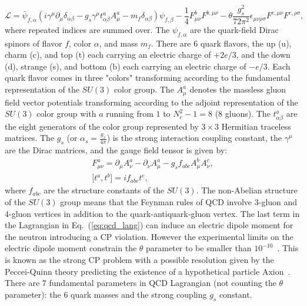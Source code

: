  \begin{equation} \label{eq:qcd_lang}
\mathcal{L} =  \bar{\psi}_{f,\alpha} (i \gamma^{\mu}\partial_{\mu}\delta_{\alpha\beta}-g_{s}\gamma^{\mu}t^{a}_{\alpha\beta}A^{a}_{\mu}-m_{f}\delta_{\alpha\beta})\psi_{f,\beta}-\frac{1}{4}F_{\mu\nu}^{b}F^{b,\mu\nu}-\theta\frac{g_{s}^2}{72\pi^2}\epsilon_{\mu\nu\rho\sigma}F^{c,\mu\nu}F^{c,\rho\sigma},
\end{equation}
where repeated indices are summed over. The $\psi_{f,\alpha}$ are the quark-field Dirac spinors of flavor $f$, color $\alpha$, and mass $m_{f}$. There are $6$ quark flavors, the up (u), charm (c), and top (t) each carrying an electric charge of $+2e/3$, and the down (d), strange (s), and bottom (b) each carrying an electric charge of $-e/3$. Each quark flavor comes in three "colors" transforming according to the fundamental representation of the $SU(3)$ color group. The $A_{\mu}^{a}$ denotes the massless gluon field vector potentials transforming according to the adjoint representation of the $SU(3)$ color group with $a$ running from $1$ to $N_{c}^2-1=8$ (8 gluons).  The $t_{\alpha\beta}^{a}$ are the eight generators of the color group represented by $3 \times 3$ Hermitian traceless matrices. The $g_{s}$ (or $\alpha_{s} = \frac{g_{s}}{4\pi}$) is the strong interaction coupling constant, the $\gamma^{\mu}$ are the Dirac matrices, and the gauge field tensor is given by:
 \begin{eqnarray} \label{eq:qcd_field}
F_{\mu\nu}^{a} = \partial_{\mu}A_{\nu}^a-\partial_{\nu}A_{\mu}^a-g_{s}f_{abc}A_{\mu}^{b}A_{\nu}^{c},  \\
\mathrm{[}t^a,t^b\mathrm{]}=if_{abc}t^{c},
\end{eqnarray}
where $f_{abc}$ are the structure constants of the $SU(3)$. The non-Abelian structure of the $SU(3)$ group means that the Feynman rules of QCD involve 3-gluon and 4-gluon vertices in addition to the quark-antiquark-gluon vertex. The last term in the Lagrangian in Eq.~(\ref{eq:qcd_lang}) can induce an electric dipole moment for the neutron introducing a CP violation. However the experimental limits on the electric dipole moment constrain the $\theta$ parameter to be smaller than $10^{-10}$~\cite{Agashe:2014kda}. This is known as the strong CP problem with a possible resolution given by the Peccei-Quinn theory predicting the existence of a hypothetical particle Axion~\cite{PhysRevLett.38.1440}. There are $7$ fundamental parameters in QCD Lagrangian (not counting the $\theta$ parameter): the $6$ quark masses and the strong coupling $g_{s}$ constant.

